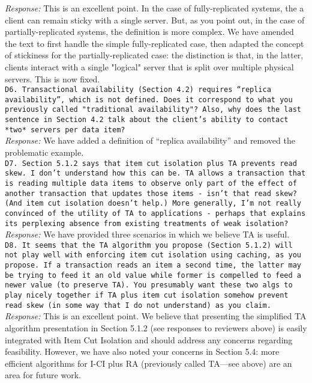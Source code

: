 \documentclass[10pt]{article}
\newcommand{\reviewer}[1] {\noindent\texttt{#1}\\}
\newcommand{\response}[1] {\noindent\textit{Response: } #1\\}
\begin{document}
\response{This is an excellent point. In the case of fully-replicated systems,
the a client can remain sticky with a single server. But, as you point
out, in the case of partially-replicated systems, the definition is
more complex. We have amended the text to first handle the simple
fully-replicated case, then adapted the concept of stickiness for the
partially-replicated case: the distinction is that, in the latter,
clients interact with a single "logical" server that is split over
multiple physical servers. This is now fixed.}

\reviewer{D6. Transactional availability (Section 4.2) requires ``replica availability'', which is not defined. Does it correspond to what you previously called "traditional availability"? Also, why does the last sentence in Section 4.2 talk about the client's ability to contact *two* servers per data item?}

\response{We have added a definition of ``replica availability'' and removed the
problematic example.}

\reviewer{D7. Section 5.1.2 says that item cut isolation plus TA prevents read skew. I don't understand how this can be. TA allows a transaction that is reading multiple data items to observe only part of the effect of another transaction that updates those items - isn't that read skew? (And item cut isolation doesn't help.) More generally, I'm not really convinced of the utility of TA to applications - perhaps that explains its perplexing absence from existing treatments of weak isolation? }

\response{We have provided three scenarios in which we believe TA is useful.}

\reviewer{D8. It seems that the TA algorithm you propose (Section 5.1.2) will not play well with enforcing item cut isolation using caching, as you propose. If a transaction reads an item a second time, the latter may be trying to feed it an old value while former is compelled to feed a newer value (to preserve TA). You presumably want these two algs to play nicely together if TA plus item cut isolation somehow prevent read skew (in some way that I do not understand) as you claim. }

\response{This is an excellent point. We believe that presenting the
  simplified TA algorithm presentation in Section 5.1.2 (see responses
  to reviewers above) is easily integrated with Item Cut Isolation and
  should address any concerns regarding feasibility. However, we have
  also noted your concerns in Section 5.4: more efficient algorithms
  for I-CI plus RA (previously called TA---see above) are an area for
  future work.}
\end{document}
